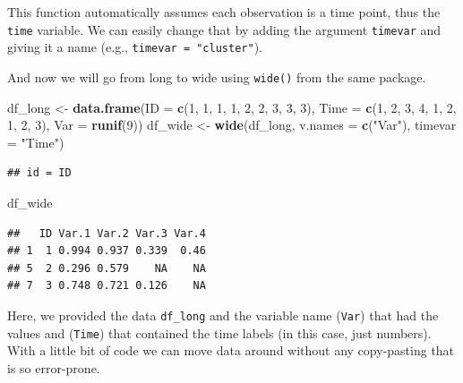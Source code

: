 \documentclass[]{tufte-book}
\newenvironment{Shaded}{}{}
\newcommand{\KeywordTok}[1]{\textcolor[rgb]{0.00,0.44,0.13}{\textbf{#1}}}
\newcommand{\DataTypeTok}[1]{\textcolor[rgb]{0.56,0.13,0.00}{#1}}
\newcommand{\DecValTok}[1]{\textcolor[rgb]{0.25,0.63,0.44}{#1}}
\newcommand{\StringTok}[1]{\textcolor[rgb]{0.25,0.44,0.63}{#1}}
\newcommand{\NormalTok}[1]{#1}
\theoremstyle{definition}
\theoremstyle{definition}
\theoremstyle{remark}
\begin{document}
This function automatically assumes each observation is a time point,
thus the \texttt{time} variable. We can easily change that by adding the
argument \texttt{timevar} and giving it a name (e.g.,
\texttt{timevar\ =\ "cluster"}).

And now we will go from long to wide using \texttt{wide()} from the same
package.

\begin{Shaded}
\begin{Highlighting}[]
\NormalTok{df_long <-}\StringTok{ }\KeywordTok{data.frame}\NormalTok{(}\DataTypeTok{ID =} \KeywordTok{c}\NormalTok{(}\DecValTok{1}\NormalTok{, }\DecValTok{1}\NormalTok{, }\DecValTok{1}\NormalTok{, }\DecValTok{1}\NormalTok{, }\DecValTok{2}\NormalTok{, }\DecValTok{2}\NormalTok{, }
    \DecValTok{3}\NormalTok{, }\DecValTok{3}\NormalTok{, }\DecValTok{3}\NormalTok{), }\DataTypeTok{Time =} \KeywordTok{c}\NormalTok{(}\DecValTok{1}\NormalTok{, }\DecValTok{2}\NormalTok{, }\DecValTok{3}\NormalTok{, }\DecValTok{4}\NormalTok{, }\DecValTok{1}\NormalTok{, }\DecValTok{2}\NormalTok{, }\DecValTok{1}\NormalTok{, }\DecValTok{2}\NormalTok{, }
    \DecValTok{3}\NormalTok{), }\DataTypeTok{Var =} \KeywordTok{runif}\NormalTok{(}\DecValTok{9}\NormalTok{))}
\NormalTok{df_wide <-}\StringTok{ }\KeywordTok{wide}\NormalTok{(df_long, }\DataTypeTok{v.names =} \KeywordTok{c}\NormalTok{(}\StringTok{"Var"}\NormalTok{), }\DataTypeTok{timevar =} \StringTok{"Time"}\NormalTok{)}
\end{Highlighting}
\end{Shaded}

\begin{verbatim}
## id = ID
\end{verbatim}

\begin{Shaded}
\begin{Highlighting}[]
\NormalTok{df_wide}
\end{Highlighting}
\end{Shaded}

\begin{verbatim}
##   ID Var.1 Var.2 Var.3 Var.4
## 1  1 0.994 0.937 0.339  0.46
## 5  2 0.296 0.579    NA    NA
## 7  3 0.748 0.721 0.126    NA
\end{verbatim}

Here, we provided the data \texttt{df\_long} and the variable name
(\texttt{Var}) that had the values and (\texttt{Time}) that contained
the time labels (in this case, just numbers). With a little bit of code
we can move data around without any copy-pasting that is so error-prone.
\end{document}
